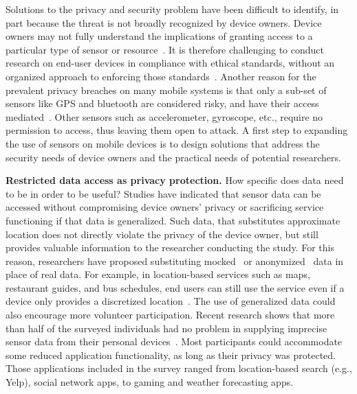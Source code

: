 Solutions to the privacy and security problem have been difficult to 
identify, in part because the threat is not broadly recognized by device 
owners. Device owners may not fully 
understand the implications of granting access to a particular type of 
sensor or resource~\cite{felt2012android}. It is therefore challenging to 
conduct research on end-user devices in compliance with ethical standards, 
without an organized approach to enforcing those 
standards~\cite{zevenbergen2013ethical}. Another reason for 
the prevalent privacy breaches on many mobile systems %
is that only a sub-set of sensors like GPS and bluetooth are considered risky, 	
and have their access mediated~\cite{android-sec}. Other sensors 
such as accelerometer, gyroscope, etc., require no permission to access, 
thus leaving them open to attack. A first step to expanding the use of sensors on mobile devices is to design solutions that address the security needs of device owners and the practical needs of potential researchers.

\textbf{Restricted data access as privacy protection.}
How specific does data need to be in order to be useful? Studies have indicated that 
sensor data can be accessed without compromising device 
owners' privacy or sacrificing service functioning if that data is generalized. 
Such data, that substitutes approximate location does not 
directly violate the privacy of the device owner, but still provides 
valuable information to the researcher conducting the study.
For this reason, researchers have proposed 
substituting mocked~\cite{beresford2011mockdroid} or 
anonymized~\cite{zhou2011taming} data in place of real data. 
For example, in location-based services such as maps, 
restaurant guides, and bus schedules, end users can still use the 
service even if a device only provides a discretized 
location~\cite{amini2011cache, krumm2007inference}. The use of 
generalized data could also encourage more volunteer participation. 
Recent research shows that more than half of the 
surveyed individuals had no problem in supplying imprecise 
sensor data from their personal devices~\cite{fawaz2014location}. 
Most participants could accommodate some reduced application 
functionality, as long as their privacy was protected. Those 
applications included in the survey
ranged from location-based search (e.g., Yelp), social 
network apps, to gaming and weather forecasting apps. 

